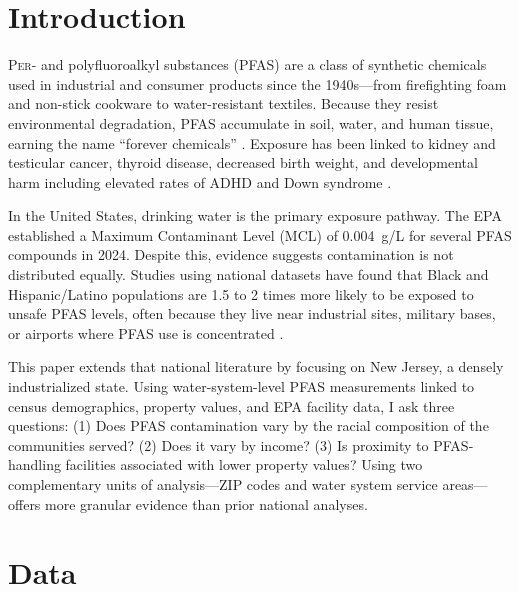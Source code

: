 \documentclass[9pt,twocolumn]{extarticle}
\begin{document}
\section{Introduction}

\lettrine[lines=2]{P}{er-} and polyfluoroalkyl substances (PFAS) are a class of synthetic chemicals used in industrial and consumer products since the 1940s---from firefighting foam and non-stick cookware to water-resistant textiles. Because they resist environmental degradation, PFAS accumulate in soil, water, and human tissue, earning the name ``forever chemicals'' \citep{erin2021pfas}. Exposure has been linked to kidney and testicular cancer, thyroid disease, decreased birth weight, and developmental harm including elevated rates of ADHD and Down syndrome \citep{birnbaum2020pfas}.

In the United States, drinking water is the primary exposure pathway. The EPA established a Maximum Contaminant Level (MCL) of 0.004~\textmu g/L for several PFAS compounds in 2024. Despite this, evidence suggests contamination is not distributed equally. Studies using national datasets have found that Black and Hispanic/Latino populations are 1.5 to 2 times more likely to be exposed to unsafe PFAS levels, often because they live near industrial sites, military bases, or airports where PFAS use is concentrated \citep{swanson2022ej}.

This paper extends that national literature by focusing on New Jersey, a densely industrialized state. Using water-system-level PFAS measurements linked to census demographics, property values, and EPA facility data, I ask three questions: (1) Does PFAS contamination vary by the racial composition of the communities served? (2) Does it vary by income? (3) Is proximity to PFAS-handling facilities associated with lower property values? Using two complementary units of analysis---ZIP codes and water system service areas---offers more granular evidence than prior national analyses.

\section{Data}
\end{document}
